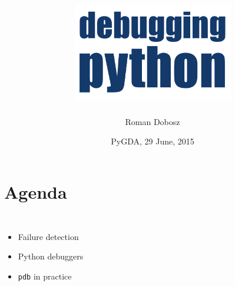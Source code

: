 \documentclass[14pt,notes,svgnames]{beamer}
\begin{document}
\title{%
    \includegraphics[width=7cm]{images/title.pdf}
}
\author{Roman Dobosz}
\date{PyGDA, 29 June, 2015}

\begin{frame}
  \titlepage
\end{frame}

\begingroup
    \section{Agenda}
\endgroup

\begin{frame}
    \begin{columns}
        \begin{itemize}[<+->]
            \item<1,2,3> Failure detection
            \item<2,3> Python debuggers
            \item<3> \lstinline{pdb} in practice
        \end{itemize}
        \centering
    \end{columns}
\end{frame}
\end{document}
